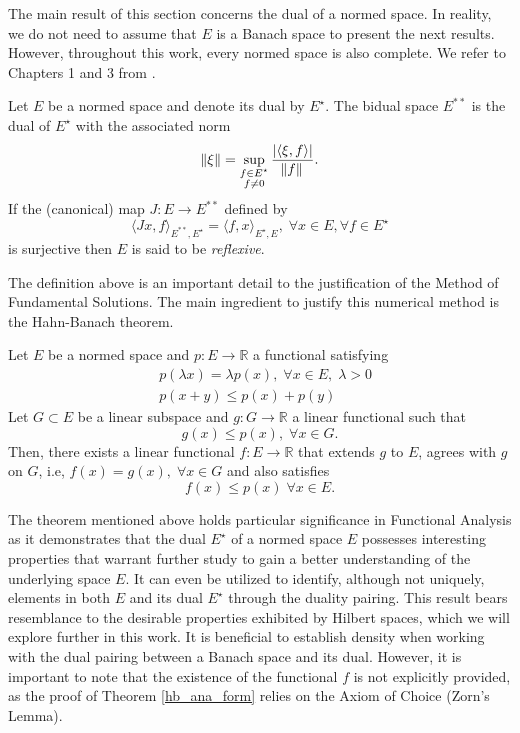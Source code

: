 The main result of this section concerns the dual of a normed space. In reality, we do not need to assume that \(E\) is a Banach space to present the next results. However, throughout this work, every normed space is also complete. We refer to Chapters 1 and 3 from \cite{brezis2011functional}.
\begin{definition}\label{reflexive_space}
    Let \(E\) be a normed space and denote its dual by \(E^\star\). The bidual space \(E^{**}\) is the dual of \(E^\star\) with the associated norm
    \[
        \norm{\xi} = \sup_{\substack{f \in E^\star\\ f \neq 0}}\frac{\abs{\langle \xi, f \rangle}}{\norm*{f}}.
    \]
    If the (canonical) map \(J: E \rightarrow E^{**}\) defined by
    \[
        \langle J x, f \rangle_{E^{**}, E^\star} = \langle f, x \rangle_{E^\star, E}, \; \forall x \in E, \forall f \in E^\star
    \]
    is surjective then \(E\) is said to be \textit{reflexive}.
\end{definition}
The definition above is an important detail to the justification of the Method of Fundamental Solutions. The main ingredient to justify this numerical method is the Hahn-Banach theorem.
\begin{theorem}\label{hb_ana_form}
    Let \(E\) be a normed space and \(p: E \rightarrow \mathbb{R}\) a functional satisfying
    \begin{align*}
        &p (\lambda x) = \lambda p(x), \; \forall x \in E, \; \lambda >0\\
        &p(x+y) \leq p(x) + p(y)
    \end{align*}
    Let \(G \subset E\) be a linear subspace and \(g: G \rightarrow \mathbb{R}\) a linear functional such that
    \[
        g(x) \leq p(x), \; \forall x \in G.
    \]
    Then, there exists a linear functional \(f: E \rightarrow \mathbb{R}\) that extends \(g\) to \(E\), agrees with \(g\) on \(G\), i.e, \(f(x) = g(x), \; \forall x \in G\) and also satisfies
    \[
        f(x) \leq p(x) \; \forall x \in E.
    \]
\end{theorem}
\begin{remark}
    The theorem mentioned above holds particular significance in Functional Analysis as it demonstrates that the dual \(E^\star\) of a normed space \(E\) possesses interesting properties that warrant further study to gain a better understanding of the underlying space \(E\). It can even be utilized to identify, although not uniquely, elements in both \(E\) and its dual \(E^\star\) through the duality pairing. This result bears resemblance to the desirable properties exhibited by Hilbert spaces, which we will explore further in this work. It is beneficial to establish density when working with the dual pairing between a Banach space and its dual. However, it is important to note that the existence of the functional \(f\) is not explicitly provided, as the proof of Theorem \eqref{hb_ana_form} relies on the Axiom of Choice (Zorn's Lemma).
\end{remark}
